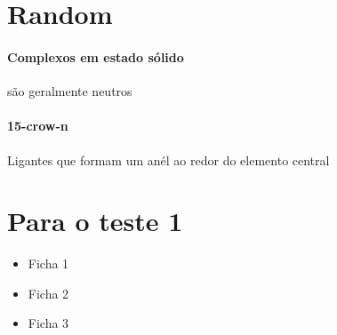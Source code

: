 \documentclass[12pt]{article}
\begin{document}
\section{Random}

\paragraph{Complexos em estado sólido} são geralmente neutros


\paragraph{15-crow-n} Ligantes que formam um anél ao redor do elemento central


\section{Para o teste 1}
\begin{itemize}
\item Ficha 1
\item Ficha 2
\item Ficha 3
\end{itemize}
\end{document}
